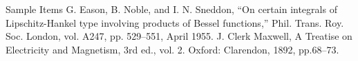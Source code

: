 \documentclass[conference]{IEEEtran}
\begin{document}

\begin{thebibliography}{00}
    Sample Items
    G. Eason, B. Noble, and I. N. Sneddon, ``On certain integrals of Lipschitz-Hankel type involving products of Bessel functions,'' Phil. Trans. Roy. Soc. London, vol. A247, pp. 529--551, April 1955.
    J. Clerk Maxwell, A Treatise on Electricity and Magnetism, 3rd ed., vol. 2. Oxford: Clarendon, 1892, pp.68--73.
   \end{thebibliography}
\end{document}
